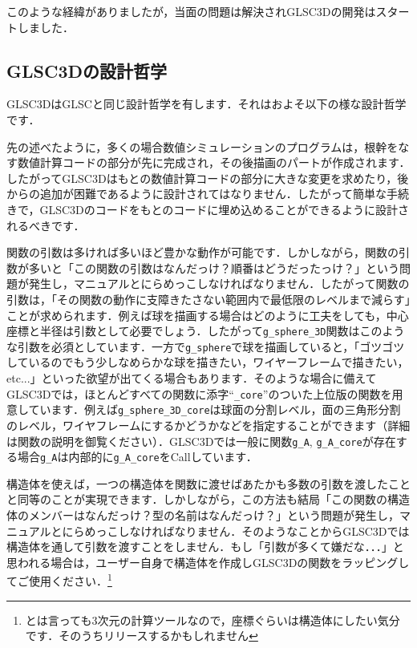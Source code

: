 \documentclass[a4paper,12pt]{jsarticle}%
\begin{document}
このような経緯がありましたが，当面の問題は解決されGLSC3Dの開発はスタートしました．

\subsection{GLSC3Dの設計哲学}

GLSC3DはGLSCと同じ設計哲学を有します．それはおよそ以下の様な設計哲学です．


先の述べたように，多くの場合数値シミュレーションのプログラムは，根幹をなす数値計算コードの部分が先に完成され，その後描画のパートが作成されます．したがってGLSC3Dはもとの数値計算コードの部分に大きな変更を求めたり，後からの追加が困難であるように設計されてはなりません．したがって簡単な手続きで，GLSC3Dのコードをもとのコードに埋め込めることができるように設計されるべきです．


関数の引数は多ければ多いほど豊かな動作が可能です．しかしながら，関数の引数が多いと「この関数の引数はなんだっけ？順番はどうだったっけ？」という問題が発生し，マニュアルとにらめっこしなければなりません．したがって関数の引数は，「その関数の動作に支障きたさない範囲内で最低限のレベルまで減らす」ことが求められます．例えば球を描画する場合はどのように工夫をしても，中心座標と半径は引数として必要でしょう．したがって\verb|g_sphere_3D|関数はこのような引数を必須としています．一方で\verb|g_sphere|で球を描画していると，「ゴツゴツしているのでもう少しなめらかな球を描きたい，ワイヤーフレームで描きたい，etc...」といった欲望が出てくる場合もあります．そのような場合に備えてGLSC3Dでは，ほとんどすべての関数に添字``\verb|_core|''のついた上位版の関数を用意しています．例えば\verb|g_sphere_3D_core|は球面の分割レベル，面の三角形分割のレベル，ワイヤフレームにするかどうかなどを指定することができます（詳細は関数の説明を御覧ください）．GLSC3Dでは一般に関数\verb|g_A|, \verb|g_A_core|が存在する場合\verb|g_A|は内部的に\verb|g_A_core|をCallしています．


構造体を使えば，一つの構造体を関数に渡せばあたかも多数の引数を渡したことと同等のことが実現できます．しかしながら，この方法も結局「この関数の構造体のメンバーはなんだっけ？型の名前はなんだっけ？」という問題が発生し，マニュアルとにらめっこしなければなりません．そのようなことからGLSC3Dでは構造体を通して引数を渡すことをしません．もし「引数が多くて嫌だな．．．」と思われる場合は，ユーザー自身で構造体を作成しGLSC3Dの関数をラッピングしてご使用ください．\footnote{とは言っても3次元の計算ツールなので，座標ぐらいは構造体にしたい気分です．そのうちリリースするかもしれません}
\end{document}
